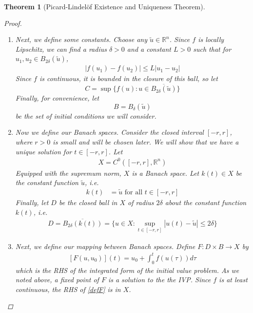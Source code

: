 \documentclass[10pt]{article}         %
\newtheorem{theorem}{Theorem}[section]
\theoremstyle{remark}
\newcommand{\R}{\mathbb{R}}
\begin{document}
\begin{theorem}[Picard-Lindel\"{o}f Existence and Uniqueness Theorem]
\begin{proof}
\begin{enumerate}
\item Next, we define some constants. Choose any $\tilde{u} \in \R^n$. Since $f$ is locally Lipschitz, we can find a radius $\delta > 0$ and a constant $L > 0$ such that for $u_1, u_2 \in B_{2 \delta}(\tilde{u})$,
\begin{align*}
|f(u_1) - f(u_2)| \leq L |u_1 - u_2|
\end{align*}
Since $f$ is continuous, it is bounded in the closure of this ball, so let
\[
C = \sup \{ f(u) : u \in \overline{ B_{2 \delta}(\tilde{u}) } \}
\]
Finally, for convenience, let
\[
B = B_\delta(\tilde{u})
\]
be the set of initial conditions we will consider.

\item Now we define our Banach spaces. Consider the closed interval $[-r, r]$, where $r > 0$ is small and will be chosen later. We will show that we have a unique solution for $t \in [-r, r]$. Let
\begin{align*}
X = C^0([-r, r], \R^n)
\end{align*}
Equipped with the supremum norm, $X$ is a Banach space. Let $k(t) \in X$ be the constant function $\tilde{u}$, i.e.
\begin{align*}
k(t) &= \tilde{u} \text{ for all } t \in [-r, r]
\end{align*}
Finally, let $D$ be the closed ball in $X$ of radius $2 \delta$ about the constant function $k(t)$, i.e.
\begin{align*}
D = \overline{ B_{2\delta}(k(t)) } = \{ u \in X : \sup_{t \in [-r,r]} | u(t) - \tilde{u} | \leq 2 \delta \}
\end{align*}
\item Next, we define our mapping between Banach spaces. Define $F: D \times B \rightarrow X$ by
\begin{align}\label{defF}
[F(u, u_0)](t) = u_0 + \int_0^t f(u(\tau)) d \tau
\end{align}
which is the RHS of the integrated form of the initial value problem. As we noted above, a fixed point of $F$ is a solution to the the IVP. Since $f$ is at least continuous, the RHS of \eqref{defF} is in $X$.


\end{enumerate}
\end{proof}
\end{theorem}
\end{document}

